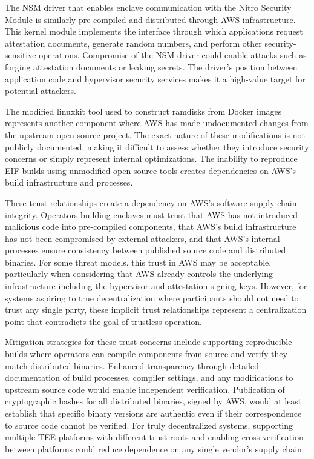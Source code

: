 The NSM driver that enables enclave communication with the Nitro Security Module is similarly pre-compiled and distributed through AWS infrastructure. This kernel module implements the interface through which applications request attestation documents, generate random numbers, and perform other security-sensitive operations. Compromise of the NSM driver could enable attacks such as forging attestation documents or leaking secrets. The driver's position between application code and hypervisor security services makes it a high-value target for potential attackers.

The modified linuxkit tool used to construct ramdisks from Docker images represents another component where AWS has made undocumented changes from the upstream open source project. The exact nature of these modifications is not publicly documented, making it difficult to assess whether they introduce security concerns or simply represent internal optimizations. The inability to reproduce EIF builds using unmodified open source tools creates dependencies on AWS's build infrastructure and processes.

These trust relationships create a dependency on AWS's software supply chain integrity. Operators building enclaves must trust that AWS has not introduced malicious code into pre-compiled components, that AWS's build infrastructure has not been compromised by external attackers, and that AWS's internal processes ensure consistency between published source code and distributed binaries. For some threat models, this trust in AWS may be acceptable, particularly when considering that AWS already controls the underlying infrastructure including the hypervisor and attestation signing keys. However, for systems aspiring to true decentralization where participants should not need to trust any single party, these implicit trust relationships represent a centralization point that contradicts the goal of trustless operation.

Mitigation strategies for these trust concerns include supporting reproducible builds where operators can compile components from source and verify they match distributed binaries. Enhanced transparency through detailed documentation of build processes, compiler settings, and any modifications to upstream source code would enable independent verification. Publication of cryptographic hashes for all distributed binaries, signed by AWS, would at least establish that specific binary versions are authentic even if their correspondence to source code cannot be verified. For truly decentralized systems, supporting multiple TEE platforms with different trust roots and enabling cross-verification between platforms could reduce dependence on any single vendor's supply chain.


